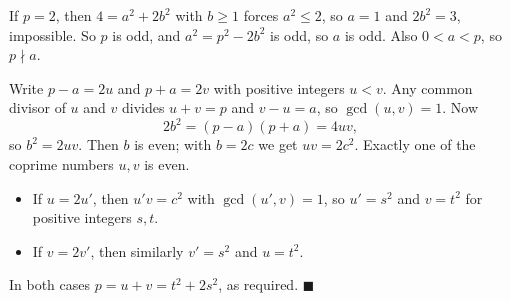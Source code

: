 If $p=2$, then $4=a^2+2b^2$ with $b\ge1$ forces $a^2\le2$, so $a=1$ and $2b^2=3$, impossible. So $p$ is odd, and $a^2=p^2-2b^2$ is odd, so $a$ is odd. Also $0<a<p$, so $p\nmid a$.

Write $p-a=2u$ and $p+a=2v$ with positive integers $u<v$. Any common divisor of $u$ and $v$ divides $u+v=p$ and $v-u=a$, so $\gcd(u,v)=1$. Now
\[2b^2=(p-a)(p+a)=4uv,\]
so $b^2=2uv$. Then $b$ is even; with $b=2c$ we get $uv=2c^2$. Exactly one of the coprime numbers $u,v$ is even.
\begin{itemize}
\item If $u=2u'$, then $u'v=c^2$ with $\gcd(u',v)=1$, so $u'=s^2$ and $v=t^2$ for positive integers $s,t$.
\item If $v=2v'$, then similarly $v'=s^2$ and $u=t^2$.
\end{itemize}
In both cases $p=u+v=t^2+2s^2$, as required. $\blacksquare$
